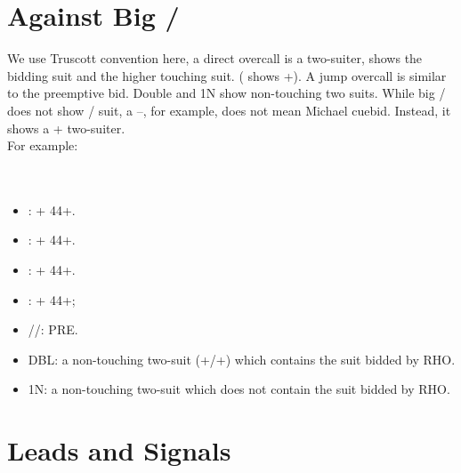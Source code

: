 \documentclass[12pt,twoside,a5paper]{report}%
\begin{document}
\chapter*{Against Big \cl{}/\di{}}
	We use Truscott convention here, a direct overcall is a two-suiter, shows the bidding suit and the higher touching suit. ( shows \sp{}+\cl{}). A jump overcall is similar to the preemptive bid. Double and 1N show non-touching two suits. While big \cl{}/\di{} does not show \cl{}/\di{} suit, a --, for example, does not mean Michael cuebid. Instead, it shows a \cl{}+\di{} two-suiter.\\
	For example:\\
	\\
	\\
	\begin{itemize}
	\renewcommand{\labelitemi}{--}
		\item {}: \di{}+\he{} 44+.
		\item {}: \he{}+\sp{} 44+.
		\item {}: \sp{}+\cl{} 44+.
		\item {}: \cl{}+\di{} 44+;
		\item {}/\he{}/\sp{}: PRE.
		\item DBL: a non-touching two-suit (\he{}+\cl{}/\sp{}+\di{}) which contains the suit bidded by RHO.
		\item 1N: a non-touching two-suit which does not contain the suit bidded by RHO.
	\end{itemize}
\chapter*{Leads and Signals}
\end{document}
